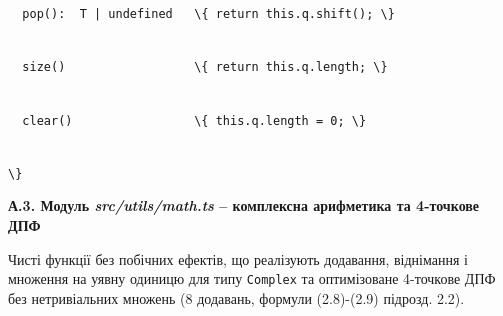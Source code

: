 \documentclass[
]{article}
\newcommand{\passthrough}[1]{#1}
\begin{document}
\passthrough{\lstinline!  !}\passthrough{\lstinline!pop!}\passthrough{\lstinline!():!}\passthrough{\lstinline!  !}\passthrough{\lstinline!T!}\passthrough{\lstinline! !}\passthrough{\lstinline!|!}\passthrough{\lstinline! !}\passthrough{\lstinline!undefined!}\passthrough{\lstinline!   !}\passthrough{\lstinline!\{!}\passthrough{\lstinline! !}\passthrough{\lstinline!return!}\passthrough{\lstinline! !}\passthrough{\lstinline!this!}\passthrough{\lstinline!.!}\passthrough{\lstinline!q!}\passthrough{\lstinline!.!}\passthrough{\lstinline!shift!}\passthrough{\lstinline!();!}\passthrough{\lstinline! !}\passthrough{\lstinline!\}!}\strut \\
\passthrough{\lstinline!  !}\passthrough{\lstinline!size!}\passthrough{\lstinline!()!}\passthrough{\lstinline!                  !}\passthrough{\lstinline!\{!}\passthrough{\lstinline! !}\passthrough{\lstinline!return!}\passthrough{\lstinline! !}\passthrough{\lstinline!this!}\passthrough{\lstinline!.!}\passthrough{\lstinline!q!}\passthrough{\lstinline!.!}\passthrough{\lstinline!length!}\passthrough{\lstinline!;!}\passthrough{\lstinline! !}\passthrough{\lstinline!\}!}\strut \\
\passthrough{\lstinline!  !}\passthrough{\lstinline!clear!}\passthrough{\lstinline!()!}\passthrough{\lstinline!                 !}\passthrough{\lstinline!\{!}\passthrough{\lstinline! !}\passthrough{\lstinline!this!}\passthrough{\lstinline!.!}\passthrough{\lstinline!q!}\passthrough{\lstinline!.!}\passthrough{\lstinline!length!}\passthrough{\lstinline! !}\passthrough{\lstinline!=!}\passthrough{\lstinline! !}\passthrough{\lstinline!0;!}\passthrough{\lstinline! !}\passthrough{\lstinline!\}!}\strut \\
\passthrough{\lstinline!\}!}

\textbf{А.3. Модуль \emph{src/utils/math.ts} -- комплексна арифметика та
4-точкове ДПФ}

Чисті функції без побічних ефектів, що реалізують додавання, віднімання
і множення на уявну одиницю для типу \passthrough{\lstinline!Complex!}
та оптимізоване 4-точкове ДПФ без нетривіальних множень (8 додавань,
формули (2.8)-(2.9) підрозд. 2.2).
\end{document}
